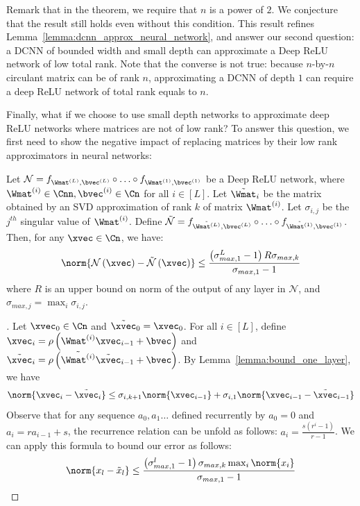 Remark that in the theorem, we require that $n$ is a power of $2$.
We conjecture that the result still holds even without this condition.
This result refines Lemma~\ref{lemma:dcnn_approx_neural_network}, and answer our second question: a DCNN of bounded width and small depth can approximate a Deep ReLU network of low  total rank.
Note that the converse is not true: because $n$-by-$n$ circulant matrix can be of rank $n$, approximating a DCNN of depth $1$ can require a deep ReLU network of total rank equals to $n$.


Finally, what if we choose to use small depth networks to approximate deep ReLU networks where matrices are not of low rank?
To answer this question, we first need to show the negative impact of replacing matrices by their low rank approximators in neural networks:

\begin{proposition}
  Let $\mathcal{N} = f_{\Wmat^{(L)},\bvec^{(L)}} \circ \ldots \circ f_{\Wmat^{(1)}, \bvec^{(1)}}$ be a Deep ReLU network, where $\Wmat^{(i)} \in \Cnn, \bvec^{(i)} \in \Cn$ for all $i \in [L]$. Let $\tilde{\Wmat}_{i}$ be the matrix obtained by an SVD approximation of rank $k$ of matrix $\Wmat^{(i)}$. Let $\sigma_{i,j}$ be the $j^{th}$ singular value of $\Wmat^{(i)}$. Define $\tilde{\mathcal{N}} = f_{\tilde{\Wmat^{(L)}},\bvec^{(L)}} \circ \ldots \circ f_{\tilde{\Wmat^{(1)}},\bvec^{(1)}}$. Then, for any $\xvec \in \Cn$, we have:
  \begin{equation}
  \norm{ \mathcal{N}\left(\xvec\right) - \tilde{\mathcal{N}} \left(\xvec\right)} \le \frac{\left(\sigma_{max,1}^{L}-1\right)R\sigma_{max,k}}{\sigma_{max,1}-1}
  \end{equation}
  where $R$ is an upper bound on norm of the output of any layer in $\mathcal{N}$, and $\sigma_{max,j} = \max_{i}\sigma_{i,j}$.
  \label{proposition:relu_to_svd}
\end{proposition}

\begin{proof}[]
  Let $\xvec_{0} \in \Cn$ and $\tilde{\xvec}_{0} = \xvec_{0}$.
  For all $i \in [L]$, define $\xvec_{i} = \rho \left(\Wmat^{(i)} \xvec_{i-1} + \bvec \right)$ and $\tilde{\xvec}_{i} = \rho \left( \tilde{\Wmat^{(i)}} \tilde{\xvec}_{i-1} + \bvec \right)$.
  By Lemma~\ref{lemma:bound_one_layer}, we have 
  \begin{equation}
    \norm{ \xvec_{i} - \tilde{\xvec}_{i}} \le \sigma_{i,k+1} \norm{ \xvec_{i-1}} + \sigma_{i,1} \norm{ \xvec_{i-1} - \tilde{\xvec}_{i-1}} 
  \end{equation}
  Observe that for any sequence $a_{0}, a_{1} \ldots$ defined recurrently by $a_{0} = 0$ and $a_{i} = ra_{i-1} + s$, the recurrence relation can be unfold as follows: $a_{i} = \frac{s \left(r^{i} - 1\right)}{r-1}$.
  We can apply this formula to bound our error as follows:
  \begin{equation}
    \norm{ x_{l} - \tilde{x}_{l} } \le\frac{ \left( \sigma_{max,1}^{l} - 1 \right) \sigma_{max,k} \max_{i} \norm{ x_{i} } }{\sigma_{max,1}-1}
  \end{equation}
\end{proof}

